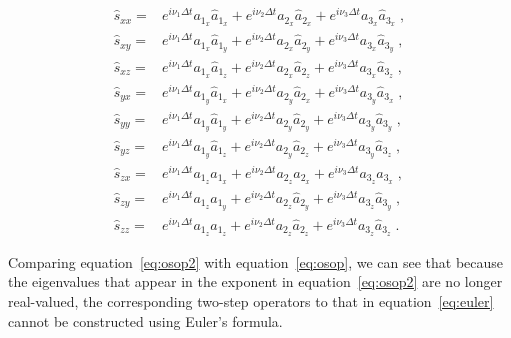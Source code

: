 \begin{align}
    \label{eq:exps2}
    \hat{s}_{xx} =& e^{i \nu_1 \Delta t} a_{1_x} \hat{a}_{1_x} + e^{i \nu_2 \Delta t} a_{2_x} \hat{a}_{2_x} + e^{i \nu_3 \Delta t} a_{3_x} \hat{a}_{3_x} \;, \\ \nonumber
    \hat{s}_{xy} =& e^{i \nu_1 \Delta t} a_{1_x} \hat{a}_{1_y} + e^{i \nu_2 \Delta t} a_{2_x} \hat{a}_{2_y} + e^{i \nu_3 \Delta t} a_{3_x} \hat{a}_{3_y} \;, \\ \nonumber
    \hat{s}_{xz} =& e^{i \nu_1 \Delta t} a_{1_x} \hat{a}_{1_z} + e^{i \nu_2 \Delta t} a_{2_x} \hat{a}_{2_z} + e^{i \nu_3 \Delta t} a_{3_x} \hat{a}_{3_z} \;, \\ \nonumber
    \hat{s}_{yx} =& e^{i \nu_1 \Delta t} a_{1_y} \hat{a}_{1_x} + e^{i \nu_2 \Delta t} a_{2_y} \hat{a}_{2_x} + e^{i \nu_3 \Delta t} a_{3_y} \hat{a}_{3_x} \;, \\ \nonumber
    \hat{s}_{yy} =& e^{i \nu_1 \Delta t} a_{1_y} \hat{a}_{1_y} + e^{i \nu_2 \Delta t} a_{2_y} \hat{a}_{2_y} + e^{i \nu_3 \Delta t} a_{3_y} \hat{a}_{3_y} \;, \\ \nonumber
    \hat{s}_{yz} =& e^{i \nu_1 \Delta t} a_{1_y} \hat{a}_{1_z} + e^{i \nu_2 \Delta t} a_{2_y} \hat{a}_{2_z} + e^{i \nu_3 \Delta t} a_{3_y} \hat{a}_{3_z} \;, \\ \nonumber
    \hat{s}_{zx} =& e^{i \nu_1 \Delta t} a_{1_z} \hat{a}_{1_x} + e^{i \nu_2 \Delta t} a_{2_z} \hat{a}_{2_x} + e^{i \nu_3 \Delta t} a_{3_z} \hat{a}_{3_x} \;, \\ \nonumber
    \hat{s}_{zy} =& e^{i \nu_1 \Delta t} a_{1_z} \hat{a}_{1_y} + e^{i \nu_2 \Delta t} a_{2_z} \hat{a}_{2_y} + e^{i \nu_3 \Delta t} a_{3_z} \hat{a}_{3_y} \;, \\ \nonumber
    \hat{s}_{zz} =& e^{i \nu_1 \Delta t} a_{1_z} \hat{a}_{1_z} + e^{i \nu_2 \Delta t} a_{2_z} \hat{a}_{2_z} + e^{i \nu_3 \Delta t} a_{3_z} \hat{a}_{3_z} \;.
\end{align}

Comparing equation~\ref{eq:osop2} with equation~\ref{eq:osop}, we can see that because the eigenvalues that appear in the exponent in equation~\ref{eq:osop2} are no longer real-valued, the corresponding two-step operators to that in equation~\ref{eq:euler} cannot be constructed using Euler's formula.

